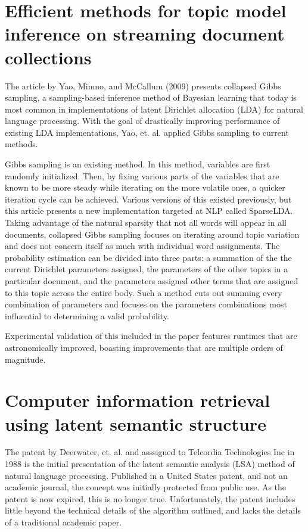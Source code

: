 \documentclass{article}
\begin{document}
\section{Efficient methods for topic model inference on streaming document collections}

The article by Yao, Mimno, and McCallum (2009) \cite{yao2009efficient} presents collapsed Gibbs sampling, a sampling-based inference method of Bayesian learning that today is most common in implementations of latent Dirichlet allocation (LDA) for natural language processing. With the goal of drastically improving performance of existing LDA implementations, Yao, et. al. applied Gibbs sampling to current methods.

Gibbs sampling is an existing method. In this method, variables are first randomly initialized. Then, by fixing various parts of the variables that are known to be more steady while iterating on the more volatile ones, a quicker iteration cycle can be achieved. Various versions of this existed previously, but this article presents a new implementation targeted at NLP called SparseLDA. Taking advantage of the natural sparsity that not all words will appear in all documents, collapsed Gibbs sampling focuses on iterating around topic variation and does not concern itself as much with individual word assignments. The probability estimation can be divided into three parts: a summation of the the current Dirichlet parameters assigned, the parameters of the other topics in a particular document, and the parameters assigned other terms that are assigned to this topic across the entire body. Such a method cuts out summing every combination of parameters and focuses on the parameters combinations most influential to determining a valid probability.

Experimental validation of this included in the paper features runtimes that are astronomically improved, boasting improvements that are multiple orders of magnitude.

\section{Computer information retrieval using latent semantic structure}

The patent by Deerwater, et. al. and asssigned to Telcordia Technologies Inc in 1988 \cite{patent4839853} is the initial presentation of the latent semantic analysis (LSA) method of natural language processing. Published in a United States patent, and not an academic journal, the concept was initially protected from public use. As the patent is now expired, this is no longer true. Unfortunately, the patent includes little beyond the technical details of the algorithm outlined, and lacks the details of a traditional academic paper.
\end{document}
